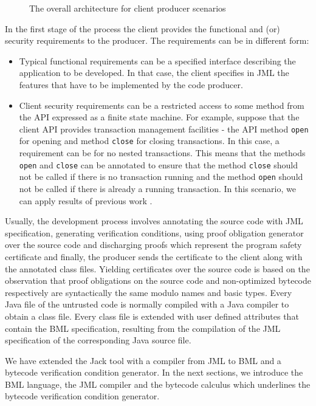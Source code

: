  \begin{figure}[!tbp]
 \centering
{}
\caption{\sc The overall architecture for client producer scenarios }
\label{architecture}
\end{figure}

In the first stage of the process the client provides the functional
and (or) security requirements to the producer.  The requirements can
be in different form:
\begin{itemize}
\item Typical functional requirements can be a specified interface
describing the application to be developed. In that case, the client
specifies in JML the features that have to be implemented by the code
producer.
\item Client security requirements can be a restricted access to some
method from the API expressed as a finite state machine.  For example,
suppose that the client API provides transaction management facilities
- the API method \texttt{open} for opening and method \texttt{close}
for closing transactions. In this case, a requirement can be for no
nested transactions.  This means that the methods \texttt{open} and
\texttt{close} can be annotated to ensure that the method
\texttt{close} should not be called if there is no transaction running
and the method \texttt{open} should not be called if there is already
a running transaction. In this scenario, we can apply results of
previous work \cite{m+04:cardis}.  
\end{itemize}
Usually, the development process involves annotating the source code
with JML specification, generating verification conditions, using
proof obligation generator over the source code and discharging proofs
which represent the program safety certificate and finally, the
producer sends the certificate to the client along with the annotated
class files.  Yielding certificates over the source code is based on
the observation that proof obligations on the source code and
non-optimized bytecode respectively are syntactically the same modulo
names and basic types. Every Java file of the untrusted code is
normally compiled with a Java compiler to obtain a class file. Every
class file is extended with user defined attributes that contain the
BML specification, resulting from the compilation of the JML
specification of the corresponding Java source file.


We have extended the Jack tool with a compiler from
 JML to BML and a bytecode verification condition generator. In the next sections, we introduce
 the BML language, the JML compiler and the bytecode \wpi calculus which underlines the bytecode verification condition generator.
 

